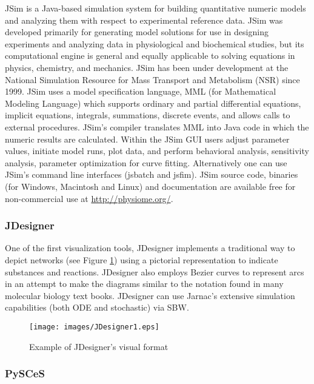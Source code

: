 \documentclass[]{article}
\makeatletter
\def\maxwidth{\ifdim\Gin@nat@width>\linewidth\linewidth
\else\Gin@nat@width\fi}
\let\Oldincludegraphics\includegraphics
\renewcommand{\includegraphics}[1]{\Oldincludegraphics[width=\maxwidth]{#1}}
\makeatother
\begin{document}
JSim \autocite{raymond03} is a Java-based simulation system for building
quantitative numeric models and analyzing them with respect to
experimental reference data. JSim was developed primarily for generating
model solutions for use in designing experiments and analyzing data in
physiological and biochemical studies, but its computational engine is
general and equally applicable to solving equations in physics,
chemistry, and mechanics. JSim has been under development at the
National Simulation Resource for Mass Transport and Metabolism (NSR)
since 1999. JSim uses a model specification language, MML (for
Mathematical Modeling Language) which supports ordinary and partial
differential equations, implicit equations, integrals, summations,
discrete events, and allows calls to external procedures. JSim's
compiler translates MML into Java code in which the numeric results are
calculated. Within the JSim GUI users adjust parameter values, initiate
model runs, plot data, and perform behavioral analysis, sensitivity
analysis, parameter optimization for curve fitting. Alternatively one
can use JSim's command line interfaces (jsbatch and jsfim). JSim source
code, binaries (for Windows, Macintosh and Linux) and documentation are
available free for non-commercial use at \url{http://physiome.org/}.

\subsubsection{JDesigner}

One of the first visualization tools, JDesigner \autocite{Sauro:Omics}
\autocite{sauro:2000} implements a traditional way to depict networks
(see Figure \ref{Figure:jdesigner}) using a pictorial representation to
indicate substances and reactions. JDesigner also employs Bezier curves
to represent arcs in an attempt to make the diagrams similar to the
notation found in many molecular biology text books. JDesigner can use
Jarnac's extensive simulation capabilities (both ODE and stochastic) via
SBW.

\begin{figure}[htbp]
\centering
\texttt{[image: images/JDesigner1.eps]}
\caption{Example of JDesigner's visual format\label{Figure:jdesigner}}
\end{figure}

\subsubsection{PySCeS}
\end{document}
